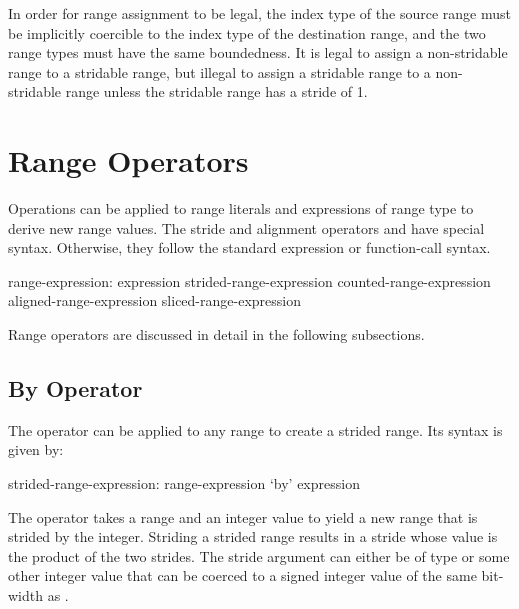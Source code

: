 In order for range assignment to be legal, the index type of the
source range must be implicitly coercible to the index type of the
destination range, and the two range types must have the same boundedness.
It is legal to assign a non-stridable range to a stridable
range, but illegal to assign a stridable range to a non-stridable
range unless the stridable range has a stride of 1.


\section{Range Operators}
\label{Range_Operators}

Operations can be applied to range literals and expressions of range type to
derive new range values.  The stride and alignment operators 
and  have special syntax.  Otherwise, they follow the standard
expression or function-call syntax.
\begin{syntax}
range-expression:
  expression
  strided-range-expression
  counted-range-expression
  aligned-range-expression
  sliced-range-expression
\end{syntax}

Range operators are discussed in detail in the following subsections.

\subsection{By Operator}
\label{By_Operator_For_Ranges}

The  operator can be applied to any range to create a strided
range.  Its syntax is given by:
\begin{syntax}
strided-range-expression:
  range-expression `by' expression
\end{syntax}

The  operator takes a range and an integer value to yield a
new range that is strided by the integer.  Striding a strided range
results in a stride whose value is the product of the two strides.
The stride argument can either be of type  or some other
integer value that can be coerced to a signed integer value of the same
bit-width as .  

